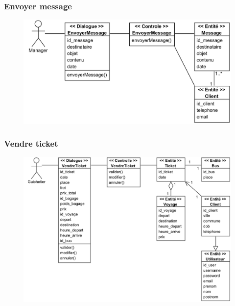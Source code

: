         \subsubsection[Envoyer message]{Envoyer message}
            \begin{figure}[H]
                \centering
                \includegraphics[width=130mm]{images/diagrammes-de-classes-participantes/envoyer-message Class Diagram.png}
                \label{fig:cpEnvSms}
            \end{figure}
        \subsubsection[Vendre ticket]{Vendre ticket}
            \begin{figure}[H]
                \centering
                \includegraphics[width=130mm]{images/diagrammes-de-classes-participantes/vendre-ticket Class Diagram.png}
                \label{fig:cpVendreTicket}
            \end{figure}
